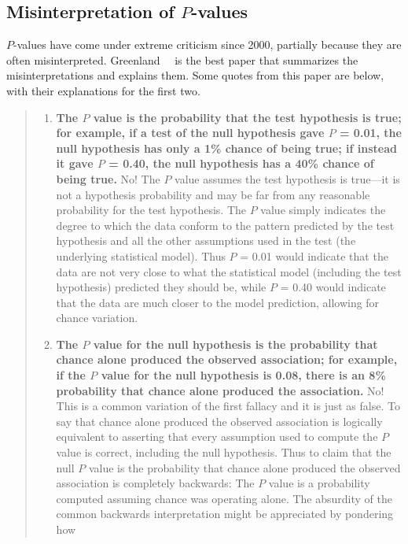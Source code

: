 \subsection{Misinterpretation of $P$-values}
$P$-values have come under extreme criticism since 2000, partially
because they are often misinterpreted. Greenland~\etal~\cite{gre16sta}
is the best paper that summarizes the misinterpretations and explains
them.  Some quotes from this paper are below, with their explanations
for the first two.

\begin{quote}
  \begin{enumerate}
  \item \textbf{The $P$ value is the probability that the test
      hypothesis is true; for example, if a test of the null
      hypothesis gave $P$ = 0.01, the null hypothesis has only a 1\%
      chance of being true; if instead it gave $P$ = 0.40, the null
      hypothesis has a 40\% chance of being true.} No! The $P$ value
    assumes the test hypothesis is true---it is not a hypothesis
    probability and may be far from any reasonable probability for the
    test hypothesis. The $P$ value simply indicates the degree to
    which the data conform to the pattern predicted by the test
    hypothesis and all the other assumptions used in the test (the
    underlying statistical model). Thus $P$ = 0.01 would indicate that
    the data are not very close to what the statistical model
    (including the test hypothesis) predicted they should be, while
    $P$ = 0.40 would indicate that the data are much closer to the
    model prediction, allowing for chance variation. 
  \item \textbf{The $P$ value for the null hypothesis is the
      probability that chance alone produced the observed association;
      for example, if the $P$ value for the null hypothesis is 0.08,
      there is an 8\% probability that chance alone produced the
      association.}  No! This is a common variation of the first
    fallacy and it is just as false. To say that chance alone produced
    the observed association is logically equivalent to asserting that
    every assumption used to compute the $P$ value is correct, including
    the null hypothesis. Thus to claim that the null $P$ value is the
    probability that chance alone produced the observed association is
    completely backwards: The $P$ value is a probability computed
    assuming chance was operating alone. The absurdity of the common
    backwards interpretation might be appreciated by pondering how

\end{enumerate}
\end{quote}
